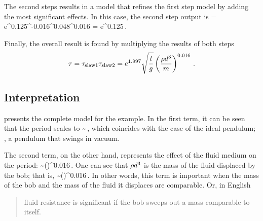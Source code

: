 The second steps results in a model that refines the first step model by adding the most significant effects. In this case, the second step output is
\beq
\pper{} = e^{0.125}\mass^{-0.016}\diam^{0.048}\dens^{0.016}
                 = e^{0.125}\,.
\eeq

Finally, the overall result is found by multiplying the results of both steps
\begin{equation}\label{eq:slawfinalmodel}
\tau = \tau_\text{slaw1}\tau_\text{slaw2}
      = e^{1.997}\sqrt{\dfrac{l}{g}}
          \left(\dfrac{\rho d^3}{m}
          \right)^{0.016}\,.
\end{equation}


\subsection{Interpretation}
 presents the complete model for the example. In the first term, it can be seen that the period scales to
\beq
\pper \sim \sqrt{\dfrac{\length}{\grav}}\,,
\eeq
which coincides with the case of the ideal pendulum; \ie, a pendulum that swings in vacuum.

The second term, on the other hand, represents the effect of the fluid medium on the period:
\beq
\pper \sim \left(\right)^{0.016}\,.
\eeq
One can see that $\rho d^3$ is the mass of the fluid displaced by the bob; that is,
\beq
\pper \sim \left(\right)^{0.016}\,.
\eeq
In other words, this term is important when the mass of the bob and the mass of the fluid it displaces are comparable. Or, in English
\begin{quote}
fluid resistance is significant if the bob sweeps out a mass comparable to itself.
\end{quote}
